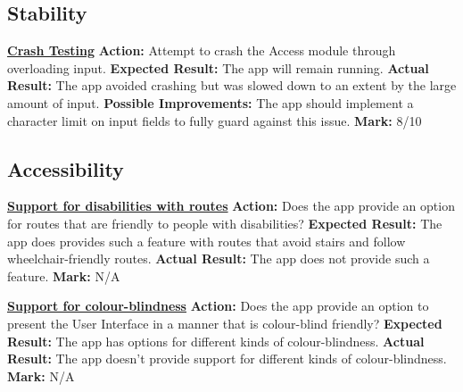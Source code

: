 \documentclass[english]{article}
\begin{document}
        \subsection{Stability}\label{subsec:overall-stability}
		    \textbf{\underline{Crash Testing}}\newline
		    \textbf{Action:} Attempt to crash the Access module through overloading input.\newline
            \textbf{Expected Result:} The app will remain running.\newline
            \textbf{Actual Result:} The app avoided crashing but was slowed down to an extent by the large amount of input.\newline
            \textbf{Possible Improvements:} The app should implement a character limit on input fields to fully guard against this issue.\newline
            \textbf{Mark:} 8/10\newline
            
        \subsection{Accessibility}\label{subsec:overall-accessibility}
		    \textbf{\underline{Support for disabilities with routes}}\newline
		    \textbf{Action:} Does the app provide an option for routes that are friendly to people with disabilities?\newline
            \textbf{Expected Result:} The app does provides such a feature with routes that avoid stairs and follow wheelchair-friendly routes.\newline
            \textbf{Actual Result:} The app does not provide such a feature.\newline
            \textbf{Mark:} N/A\newline
            
        \textbf{\underline{Support for colour-blindness}}\newline
		    \textbf{Action:} Does the app provide an option to present the User Interface in a manner that is colour-blind friendly?\newline
            \textbf{Expected Result:} The app has options for different kinds of colour-blindness.\newline
            \textbf{Actual Result:} The app doesn't provide support for different kinds of colour-blindness.\newline
            \textbf{Mark:} N/A\newline
\end{document}
